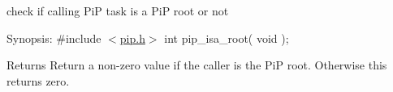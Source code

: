 check if calling Pi\-P task is a Pi\-P root or not

\begin{DoxyParagraph}{Synopsis\-:}
\#include $<$\hyperlink{pip_8h_source}{pip.\-h}$>$ int pip\-\_\-isa\-\_\-root( void );
\end{DoxyParagraph}
\begin{DoxyReturn}{Returns}
Return a non-\/zero value if the caller is the Pi\-P root. Otherwise this returns zero. 
\end{DoxyReturn}
